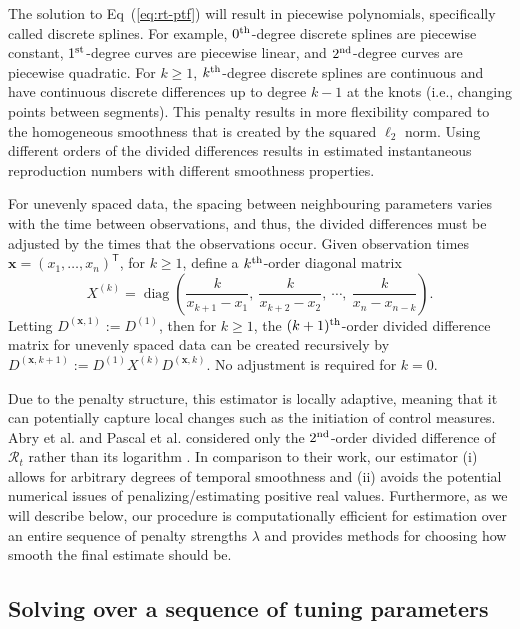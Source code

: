 \documentclass[10pt,letterpaper]{article}
\newcommand{\lr}[1]{\left(#1\right)}
\DeclareMathOperator*{\diag}{diag}
\def\bfx{\mathbf{x}}
\def\calR{\mathcal{R}}
\renewcommand{\top}{\mathsf{T}}
\def\th{^{\textnormal{th}}}
\def\first{$1^{\textnormal{st}}$}
\def\second{$2^{\textnormal{nd}}$}
\renewcommand{\eqref}[1]{Eq~(\ref{#1})}
\begin{document}
The solution to \eqref{eq:rt-ptf} will result in piecewise
polynomials, specifically called discrete splines. For example, $0\th$-degree
discrete splines are piecewise constant, \first-degree curves are piecewise
linear, and \second-degree curves are piecewise quadratic. For $k\geq 1$,
$k\th$-degree discrete splines are continuous and have continuous discrete
differences up to degree $k-1$ at the knots (i.e., changing points between segments). This penalty results in more
flexibility compared to the homogeneous smoothness that is created by the
squared $\ell_2$ norm. Using different orders of the divided differences results in
estimated instantaneous reproduction numbers with different smoothness properties. 



For unevenly spaced data, the spacing between neighbouring parameters
varies with the time between observations, and thus, the divided differences
must be adjusted by the times that the observations occur. Given observation
times $\bfx = {(x_1,\dots,x_n)}^\top$, for $k \geq 1$, define a $k\th$-order
diagonal matrix 
\begin{equation}
  X^{(k)} = \diag \lr{\frac{k}{x_{k+1} - x_1},\ \frac{k}{x_{k+2} - x_2},\ 
  \cdots,\ \frac{k}{x_n - x_{n-k}} }.
\end{equation}
Letting $D^{(\bfx,1)} := D^{(1)}$,
then for $k\geq 1$, the $(k+1)\th$-order divided difference matrix for unevenly
spaced data can be created recursively by
$D^{(\bfx, k+1)} := D^{(1)} X^{(k)} D^{(\bfx,k)}.$ No adjustment is required
for $k=0$. 


Due to the penalty structure, this estimator is locally adaptive,
meaning that it can potentially capture local changes such as the initiation of
control measures. Abry et al. and Pascal et al. considered only the
\second-order divided difference of $\calR_t$ rather than its logarithm 
\cite{abry2020spatial,pascal2022nonsmooth}. In
comparison to their work, our estimator (i) allows for arbitrary degrees of
temporal smoothness and (ii) avoids the potential numerical issues of
penalizing/estimating positive real values. Furthermore, as we will describe
below, our procedure is computationally efficient for estimation over an entire
sequence of penalty strengths $\lambda$ and provides methods for choosing how
smooth the final estimate should be.


\subsection{Solving over a sequence of tuning parameters}
\label{sec:candidate-set}
\end{document}
